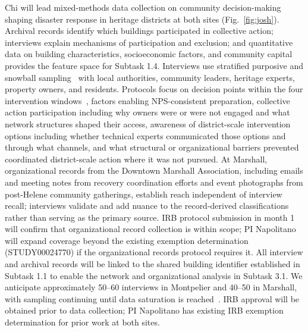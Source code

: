 \documentclass[11pt]{article}
\begin{document}
Chi will lead mixed-methods data collection on community decision-making shaping
disaster response in heritage districts at both sites (Fig.~\ref{fig:josh}).
Archival records identify which buildings participated in collective action; interviews
explain mechanisms of participation and exclusion; and quantitative data on building
characteristics, socioeconomic factors, and community capital~\cite{uscensus_acs5year,li2023collective}
provides the feature space for Subtask 1.4.
Interviews use stratified purposive and snowball sampling~\cite{maxwell1996methods}
with local authorities, community leaders, heritage experts, property owners, and residents.
Protocols focus on decision points within the four intervention
windows~\cite{maalouf2025a,maalouf2025b}, factors enabling NPS-consistent preparation,
collective action participation including why owners were or were not engaged and
what network structures shaped their access, awareness of district-scale intervention
options including whether technical experts communicated those options and through
what channels, and what structural or organizational barriers prevented coordinated
district-scale action where it was not pursued.
At Marshall, organizational records from the Downtown Marshall Association, including
emails and meeting notes from recovery coordination efforts and event photographs from
post-Helene community gatherings, establish reach independent of interview recall;
interviews validate and add nuance to the record-derived classifications rather than
serving as the primary source.
IRB protocol submission in month 1 will confirm that organizational record collection
is within scope; PI Napolitano will expand coverage beyond the existing exemption
determination (STUDY00024770) if the organizational records protocol requires it.
All interview and archival records will be linked to the shared building identifier
established in Subtask 1.1 to enable the network and organizational analysis in
Subtask 3.1.
We anticipate approximately 50--60 interviews in Montpelier and 40--50 in Marshall,
with sampling continuing until data saturation is reached~\cite{maxwell1996methods}.
IRB approval will be obtained prior to data collection; PI Napolitano has existing
IRB exemption determination for prior work at both sites.

\end{document}
